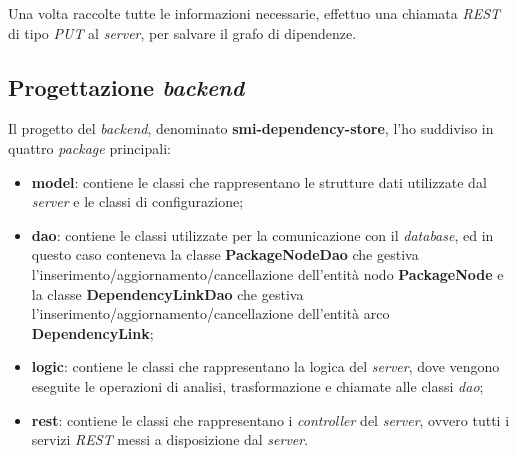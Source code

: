 Una volta raccolte tutte le informazioni necessarie, effettuo una chiamata \textit{REST} di tipo \textit{PUT} al \textit{server},
per salvare il grafo di dipendenze.\\
\subsection*{Progettazione \textit{backend}}
Il progetto del \textit{backend}, denominato \textbf{smi-dependency-store}, l'ho suddiviso in quattro \textit{package} principali:
\begin{itemize}
  \item \textbf{model}: contiene le classi che rappresentano le strutture dati utilizzate dal \textit{server} e 
  le classi di configurazione;
  \item \textbf{dao}: contiene le classi utilizzate per la comunicazione con il \textit{database}, ed in questo caso
  conteneva la classe \textbf{PackageNodeDao} che gestiva l'inserimento/aggiornamento/cancellazione dell'entità nodo \textbf{PackageNode}
  e la classe \textbf{DependencyLinkDao} che gestiva l'inserimento/aggiornamento/cancellazione dell'entità arco \textbf{DependencyLink};
  \item \textbf{logic}: contiene le classi che rappresentano la logica del \textit{server}, dove vengono eseguite le operazioni di analisi, 
  trasformazione e chiamate alle classi \textit{dao};
  \item \textbf{rest}: contiene le classi che rappresentano i \textit{controller} del \textit{server}, 
  ovvero tutti i servizi \textit{REST} messi a disposizione dal \textit{server}.
\end{itemize}

